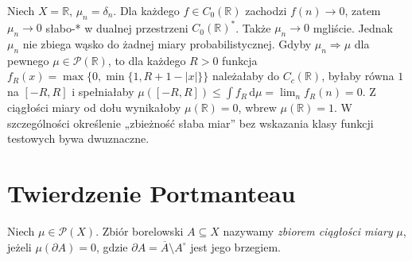 \begin{przyklad}
\label{ex:mass-escape-22}
Niech $X=\mathbb R$, $\mu_n=\delta_n$.
Dla każdego $f\in C_0(\mathbb R)$ zachodzi $f(n)\to0$,
zatem $\mu_n\to0$ słabo-* w dualnej przestrzeni
$C_0(\mathbb R)^*$. Także $\mu_n\to0$ mgliście.
Jednak $\mu_n$ nie zbiega wąsko do żadnej miary
probabilistycznej. Gdyby $\mu_n\Rightarrow\mu$ dla pewnego
$\mu\in\mathcal P(\mathbb R)$, to dla każdego $R>0$
funkcja $f_R(x)=\max\{0,\min\{1,R+1-|x|\}\}$
należałaby do $C_c(\mathbb R)$, byłaby równa $1$ na
$[-R,R]$ i spełniałaby
$\mu([-R,R])\le\int f_R\,\mathrm d\mu
=\lim_n f_R(n)=0$.
Z ciągłości miary od dołu wynikałoby $\mu(\mathbb R)=0$,
wbrew $\mu(\mathbb R)=1$.
W szczególności określenie „zbieżność słaba miar” bez
wskazania klasy funkcji testowych bywa dwuznaczne.
\end{przyklad}

\section{Twierdzenie Portmanteau}
\begin{definicja}
\label{def:continuity-set-22}
Niech $\mu\in\mathcal P(X)$. Zbiór borelowski
$A\subseteq X$ nazywamy \emph{zbiorem ciągłości miary}
$\mu$, jeżeli $\mu(\partial A)=0$, gdzie
$\partial A=\overline A\setminus A^\circ$ jest jego brzegiem.
\end{definicja}

